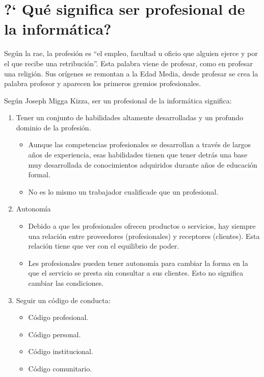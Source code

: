 
\section{?` Qué significa ser profesional de la informática?}

Según la \gls{rae}, la profesión es ``el empleo, facultad u oficio que alguien ejerce y por el que recibe una retribución''. Esta palabra viene de profesar, como en profesar una religión. Sus orígenes se remontan a la Edad Media, desde profesar se crea la palabra profesor y aparecen los primeros gremios profesionales.

Según Joseph Migga Kizza, ser un profesional de la informática significa:
\begin{enumerate}[label=\textbf{\arabic*.}]
    \item Tener un conjunto de habilidades altamente desarrolladas y un profundo dominio de la profesión.
          \begin{itemize}
              \item Aunque las competencias profesionales se desarrollan a través de largos años de experiencia, esas habilidades tienen que tener detrás una base muy desarrollada de conocimientos adquiridos durante años de educación formal.
              \item No es lo mismo un trabajador cualificade que un profesional.
          \end{itemize}
    \item Autonomía
          \begin{itemize}
              \item Debido a que les profesionales ofrecen productos o servicios, hay siempre una relación entre proveedores (profesionales) y receptores (clientes). Esta relación tiene que ver con el equilibrio de poder.
              \item Les profesionales pueden tener autonomía para cambiar la forma en la que el servicio se presta sin consultar a sus clientes. Esto no significa cambiar las condiciones.
          \end{itemize}
    \item Seguir un código de conducta:
          \begin{itemize}
              \item Código profesional.
              \item Código personal.
              \item Código institucional.
              \item Código comunitario.
          \end{itemize}
\end{enumerate}

